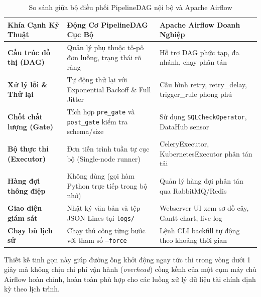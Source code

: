 \begin{table}[htbp]
\centering
\scriptsize
\setlength{\tabcolsep}{3pt}
\caption{So sánh giữa bộ điều phối PipelineDAG nội bộ và Apache Airflow}
\label{tab:airflow_comparison}
\begin{tabularx}{\textwidth}{p{2.8cm} X X}
\toprule
\textbf{Khía Cạnh Kỹ Thuật} & \textbf{Động Cơ PipelineDAG Cục Bộ} & \textbf{Apache Airflow Doanh Nghiệp} \\
\midrule
\textbf{Cấu trúc đồ thị (DAG)} & Quản lý phụ thuộc tô-pô đơn luồng, trạng thái rõ ràng & Hỗ trợ DAG phức tạp, đa nhánh, chạy phân tán \\
\textbf{Xử lý lỗi \& Thử lại} & Tự động thử lại với Exponential Backoff \& Full Jitter & Cấu hình retry, retry\_delay, trigger\_rule phong phú \\
\textbf{Chốt chất lượng (Gate)} & Tích hợp \texttt{pre\_gate} và \texttt{post\_gate} kiểm tra schema/size & Sử dụng \texttt{SQLCheckOperator}, DataHub sensor \\
\textbf{Bộ thực thi (Executor)} & Đơn tiến trình tuần tự cục bộ (Single-node runner) & CeleryExecutor, KubernetesExecutor phân tán tải \\
\textbf{Hàng đợi thông điệp} & Không dùng (gọi hàm Python trực tiếp trong bộ nhớ) & Quản lý hàng đợi phân tán qua RabbitMQ/Redis \\
\textbf{Giao diện giám sát} & Nhật ký văn bản và tệp JSON Lines tại \texttt{logs/} & Webserver UI xem sơ đồ cây, Gantt chart, live log \\
\textbf{Chạy bù lịch sử} & Chạy thủ công từng bước với tham số \texttt{--force} & Lệnh CLI backfill tự động theo khoảng thời gian \\
\bottomrule
\end{tabularx}
\end{table}

Thiết kế tinh gọn này giúp đường ống khởi động ngay tức thì trong vòng dưới 1 giây mà không chịu chi phí vận hành (\textit{overhead}) cồng kềnh của một cụm máy chủ Airflow hoàn chỉnh, hoàn toàn phù hợp cho các luồng xử lý dữ liệu tài chính định kỳ theo lịch trình.
